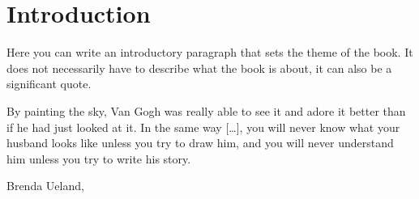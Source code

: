 
\thispagestyle{empty}


\chapter{Introduction}\label{epigraph:cha}

Here you can write an introductory paragraph that sets the theme of the book. It does not necessarily have to describe what the book is about, it can also be a significant quote.

\begin{myquotation} By painting the sky, Van Gogh was really able to see it and adore it better than if he had just looked at it. In the same way [\dots], you will never know what your husband looks like unless you try to draw him, and you will never understand him unless you try to write his story.\par\mbox{}\hfill \emdash{}Brenda Ueland,  \ifxetex\label{gogh-sky-quote}\else\citep[pp.~23--24]{ifyouwanttowrite}\fi\par\end{myquotation}

\hfil{}\hfil